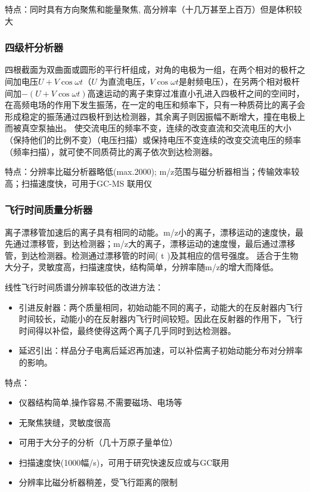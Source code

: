 特点：同时具有方向聚焦和能量聚焦, 高分辨率（十几万甚至上百万）但是体积较大
\subsubsection*{四级杆分析器}
四根截面为双曲面或圆形的平行杆组成，对角的电极为一组，在两个相对的极杆之间加电压$U+V\cos\omega t$（$U$ 为直流电压，$V\cos\omega t$是射频电压），在另两个相对极杆间加$-(U+V\cos\omega t)$高速运动的离子束穿过准直小孔进入四极杆之间的空间时，在高频电场的作用下发生振荡，在一定的电压和频率下，只有一种质荷比的离子会形成稳定的振荡通过四极杆到达检测器，其余离子则因振幅不断增大，撞在电极上而被真空泵抽出。 使交流电压的频率不变，连续的改变直流和交流电压的大小（保持他们的比例不变）（电压扫描）或保持电压不变连续的改变交流电压的频率（频率扫描），就可使不同质荷比的离子依次到达检测器。

特点：分辨率比磁分析器略低(max.2000); m/z范围与磁分析器相当；传输效率较高；扫描速度快，可用于GC-MS 联用仪

\subsubsection*{飞行时间质量分析器}
离子漂移管加速后的离子具有相同的动能。m/z小的离子，漂移运动的速度快，最先通过漂移管，到达检测器；m/z大的离子，漂移运动的速度慢，最后通过漂移管，到达检测器。检测通过漂移管的时间( t )及其相应的信号强度。
适合于生物大分子，灵敏度高，扫描速度快，结构简单，分辨率随m/z的增大而降低。

线性飞行时间质谱分辨率较低的改进方法： 
\begin{itemize}
    \item  引进反射器：两个质量相同，初始动能不同的离子，动能大的在反射器内飞行时间较长，动能小的在反射器内飞行时间较短。因此在反射器的作用下，飞行时间得以补偿，最终使得这两个离子几乎同时到达检测器。
    \item 延迟引出：样品分子电离后延迟再加速，可以补偿离子初始动能分布对分辨率的影响。
\end{itemize}

特点：
\begin{itemize}
    \item 仪器结构简单,操作容易,不需要磁场、电场等
    \item 无聚焦狭缝，灵敏度很高
    \item 可用于大分子的分析（几十万原子量单位）
    \item 扫描速度快(1000幅/s)，可用于研究快速反应或与GC联用
    \item 分辨率比磁分析器稍差，受飞行距离的限制
\end{itemize}

